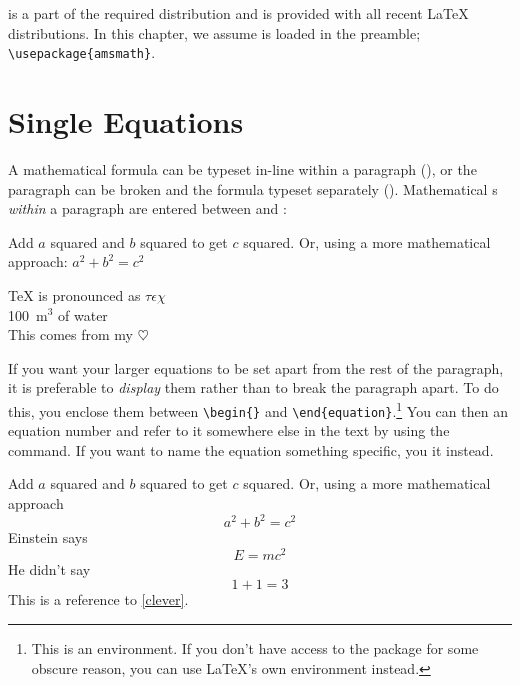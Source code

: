  is a part of the required distribution and is provided
with all recent \LaTeX{} distributions. In this chapter, we assume
   is loaded in the preamble; \verb|\usepackage{amsmath}|.

\section{Single Equations}
  
A mathematical formula can be typeset in-line within a paragraph (\emph{}), or the paragraph can be broken and the formula typeset separately
(\emph{}). Mathematical s 
\emph{within} a paragraph are entered
between \ai{\$} and \ai{\$}:
\begin{example}
Add $a$ squared and $b$ squared
to get $c$ squared. Or, using 
a more mathematical approach:
$a^2 + b^2 = c^2$
\end{example}
\begin{example}
\TeX{} is pronounced as 
$\tau\epsilon\chi$\\[5pt]
100~m$^{3}$ of water\\[5pt]
This comes from my $\heartsuit$
\end{example}

If you want your larger equations to be set apart
from the rest of the paragraph, it is preferable to \emph{display} them
rather than to break the paragraph apart.
To do this, you enclose them between \verb|\begin{|\verb|}| and
\verb|\end{equation}|.\footnote{This is an  environment. If you don't
have access to the package for some obscure reason, you can use \LaTeX's own
 environment instead.} You can then  an equation number and refer to
it somewhere else in the text by using the  command. If you want to
name the equation something specific, you  it instead.
\begin{example}
Add $a$ squared and $b$ squared
to get $c$ squared. Or, using
a more mathematical approach
 \begin{equation}
   a^2 + b^2 = c^2
 \end{equation}
Einstein says
 \begin{equation}
   E = mc^2 \label{clever}
 \end{equation}
He didn't say
 \begin{equation}
  1 + 1 = 3 \tag{dumb}
 \end{equation}
This is a reference to 
\eqref{clever}. 
\end{example}

